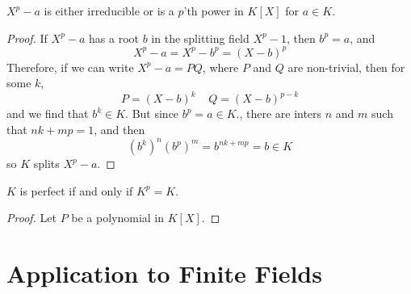 \begin{lemma}
    $X^p - a$ is either irreducible or is a $p$'th power in $K[X]$ for $a \in K$.
\end{lemma}
\begin{proof}
    If $X^p - a$ has a root $b$ in the splitting field $X^p - 1$, then $b^p = a$, and
    \[ X^p - a = X^p - b^p = (X - b)^p \]
    Therefore, if we can write $X^p - a = PQ$, where $P$ and $Q$ are non-trivial, then for some $k$,
    \[ P = (X - b)^k\ \ \ \ \ Q = (X - b)^{p - k} \]
    and we find that $b^k \in K$. But since $b^p = a \in K$., there are inters $n$ and $m$ such that $nk + mp = 1$, and then
    \[ (b^k)^n(b^p)^m = b^{nk + mp} = b \in K \]
    so $K$ splits $X^p - a$.
\end{proof}

\begin{prop}
    $K$ is perfect if and only if $K^p = K$.
\end{prop}
\begin{proof}
    Let $P$ be a polynomial in $K[X]$.
\end{proof}





\section{Application to Finite Fields}

